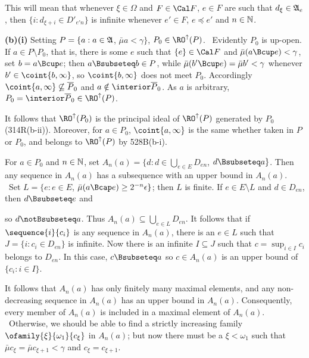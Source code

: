 {

\noindent This will mean that whenever $\xi\in\Omega$ and $F\in\Cal F$,
$e\in F$ are such that $d_{\xi}\in\frak A_e$, then
$\{i:d_{\xi+i}\in D'_{e'n}\}$ is infinite whenever $e'\in F$,
$e\preccurlyeq e'$ and $n\in\Bbb N$.

\medskip

{\bf (b)(i)} Setting $P=\{a:a\in\frak A$, $\bar\mu a<\gamma\}$,
$P_0\in\RO^{\uparrow}(P)$.   \Prf\ Evidently $P_0$ is up-open.   If
$a\in P\setminus P_0$, that is, there is some $e$ such that
$\{e\}\in\Cal F$ and $\bar\mu(a\Bcup e)<\gamma$, set $b=a\Bcup e$;  then
$a\Bsubseteq b\in P$, while $\bar\mu(b'\Bcup e)=\bar\mu b'<\gamma$ whenever
$b'\in\coint{b,\infty}$, so $\coint{b,\infty}$ does not meet $P_0$.
Accordingly $\coint{a,\infty}\not\subseteq\overline{P}_0$ and
$a\notin\interior\overline{P}_0$.   As $a$ is arbitrary,
$P_0=\interior\overline{P}_0\in\RO^{\uparrow}(P)$.\ \Qed

It follows that $\RO^{\uparrow}(P_0)$ is the principal ideal of
$\RO^{\uparrow}(P)$ generated by $P_0$ (314R(b-ii)).
Moreover, for $a\in P_0$, $\coint{a,\infty}$ is the same
whether taken in $P$ or $P_0$, and belongs to $\RO^{\uparrow}(P)$ by
528B(b-i).

\medskip

 For $a\in P_0$ and $n\in\Bbb N$, set
$A_n(a)=\{d:d\in\bigcup_{e\in E}D_{en}$, $d\Bsubseteq a\}$.   Then any
sequence in $A_n(a)$ has a subsequence with an upper bound in $A_n(a)$.
\Prf\ Set $L=\{e:e\in E$, $\bar\mu(a\Bcap e)\ge 2^{-n}\epsilon\}$;  then
$L$ is finite.   If $e\in E\setminus L$ and $d\in D_{en}$, then
$d\Bsubseteq e$ and


\noindent so
$d\notBsubseteq a$.   Thus $A_n(a)\subseteq\bigcup_{e\in L}D_{en}$.
It follows that if $\sequence{i}{c_i}$ is any sequence in $A_n(a)$, there
is an $e\in L$ such that $J=\{i:c_i\in D_{en}\}$ is infinite.   Now there
is an infinite $I\subseteq J$ such that $c=\sup_{i\in I}c_i$ belongs to
$D_{en}$.   In this case, $c\Bsubseteq a$ so $c\in A_n(a)$ is an upper
bound of $\{c_i:i\in I\}$.\ \Qed

It follows that $A_n(a)$ has only finitely many maximal elements, and any
non-decreasing sequence in $A_n(a)$ has an upper bound in $A_n(a)$.
Consequently,
every member of $A_n(a)$ is included in a maximal element of $A_n(a)$.
\Prf\Quer\ Otherwise, we should be able to
find a strictly increasing family
$\ofamily{\xi}{\omega_1}{c_{\xi}}$ in $A_n(a)$;   but now there must be a
$\xi<\omega_1$ such that $\bar\mu c_{\xi}=\bar\mu c_{\xi+1}<\gamma$ and
$c_{\xi}=c_{\xi+1}$.\ \Bang\Qed

}

